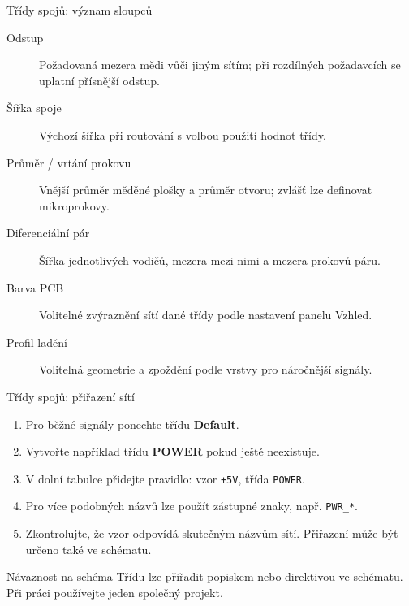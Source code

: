 \documentclass{beamer}
\begin{document}
\begin{frame}{Třídy spojů: význam sloupců}
	\small
	\begin{description}
		\item[Odstup] Požadovaná mezera mědi vůči jiným sítím; při rozdílných požadavcích se uplatní přísnější odstup.
		\item[Šířka spoje] Výchozí šířka při routování s volbou použití hodnot třídy.
		\item[Průměr / vrtání prokovu] Vnější průměr měděné plošky a průměr otvoru; zvlášť lze definovat mikroprokovy.
		\item[Diferenciální pár] Šířka jednotlivých vodičů, mezera mezi nimi a mezera prokovů páru.
		\item[Barva PCB] Volitelné zvýraznění sítí dané třídy podle nastavení panelu Vzhled.
		\item[Profil ladění] Volitelná geometrie a zpoždění podle vrstvy pro náročnější signály.
	\end{description}
\end{frame}

\begin{frame}{Třídy spojů: přiřazení sítí}
	\begin{enumerate}
		\item Pro běžné signály ponechte třídu \textbf{Default}.
		\item Vytvořte například třídu \textbf{POWER} pokud ještě neexistuje.
		\item V dolní tabulce přidejte pravidlo: vzor \texttt{+5V}, třída \texttt{POWER}.
		\item Pro více podobných názvů lze použít zástupné znaky, např. \texttt{PWR\_*}.
		\item Zkontrolujte, že vzor odpovídá skutečným názvům sítí. Přiřazení může být určeno také ve schématu.
	\end{enumerate}
	\begin{block}{Návaznost na schéma}
	Třídu lze přiřadit popiskem nebo direktivou ve schématu. Při práci používejte jeden společný projekt.
	\end{block}
\end{frame}
\end{document}
